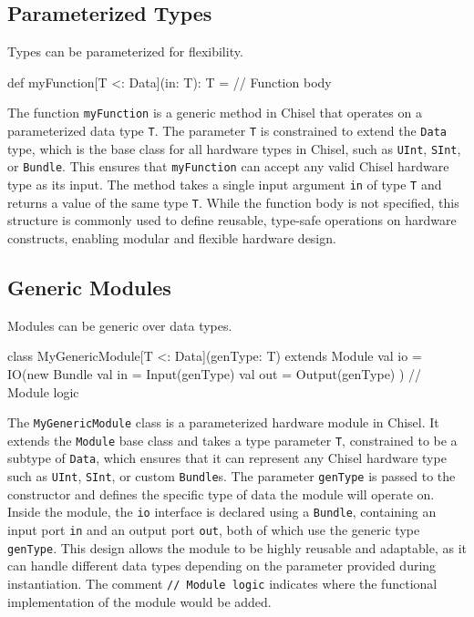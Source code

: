\subsection{Parameterized Types}
Types can be parameterized for flexibility.
\begin{chiselcode}
def myFunction[T <: Data](in: T): T = {
  // Function body
}
\end{chiselcode}

The function \texttt{myFunction} is a generic method in Chisel that operates on a parameterized data type \texttt{T}. The parameter \texttt{T} is constrained to extend the \texttt{Data} type, which is the base class for all hardware types in Chisel, such as \texttt{UInt}, \texttt{SInt}, or \texttt{Bundle}. This ensures that \texttt{myFunction} can accept any valid Chisel hardware type as its input. The method takes a single input argument \texttt{in} of type \texttt{T} and returns a value of the same type \texttt{T}. While the function body is not specified, this structure is commonly used to define reusable, type-safe operations on hardware constructs, enabling modular and flexible hardware design.

\subsection{Generic Modules}
Modules can be generic over data types.
\begin{chiselcode}
class MyGenericModule[T <: Data](genType: T) extends Module {
  val io = IO(new Bundle {
    val in  = Input(genType)
    val out = Output(genType)
  })
  // Module logic
}
\end{chiselcode}

The \texttt{MyGenericModule} class is a parameterized hardware module in Chisel. It extends the \texttt{Module} base class and takes a type parameter \texttt{T}, constrained to be a subtype of \texttt{Data}, which ensures that it can represent any Chisel hardware type such as \texttt{UInt}, \texttt{SInt}, or custom \texttt{Bundle}s. The parameter \texttt{genType} is passed to the constructor and defines the specific type of data the module will operate on. Inside the module, the \texttt{io} interface is declared using a \texttt{Bundle}, containing an input port \texttt{in} and an output port \texttt{out}, both of which use the generic type \texttt{genType}. This design allows the module to be highly reusable and adaptable, as it can handle different data types depending on the parameter provided during instantiation. The comment \texttt{// Module logic} indicates where the functional implementation of the module would be added.


